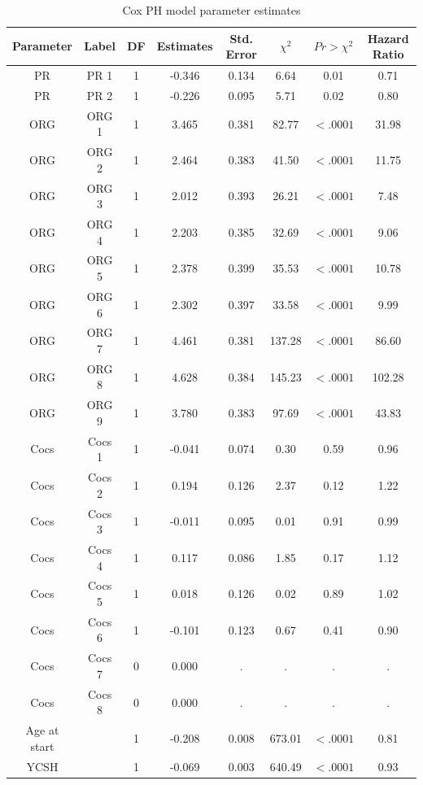 \begin{table}
	\centering
	\small
	\caption{Cox PH model parameter estimates}
	\begin{tabular}{cccccccc}
		\hline
		Parameter & Label & DF    &  Estimates & Std. Error & $\chi^2$    &  $Pr>\chi^2$ & Hazard Ratio \\
		\hline
		PR    & PR 1  & 1     & -0.346 & 0.134 & 6.64  & 0.01  & 0.71 \\
		PR    & PR 2  & 1     & -0.226 & 0.095 & 5.71  & 0.02  & 0.80 \\
		ORG   & ORG 1 & 1     & 3.465 & 0.381 & 82.77 & $<.0001$ & 31.98 \\
		ORG   & ORG 2 & 1     & 2.464 & 0.383 & 41.50 & $<.0001$ & 11.75 \\
		ORG   & ORG 3 & 1     & 2.012 & 0.393 & 26.21 & $<.0001$ & 7.48 \\
		ORG   & ORG 4 & 1     & 2.203 & 0.385 & 32.69 & $<.0001 $& 9.06 \\
		ORG   & ORG 5 & 1     & 2.378 & 0.399 & 35.53 & $<.0001$ & 10.78 \\
		ORG   & ORG 6 & 1     & 2.302 & 0.397 & 33.58 & $<.0001$ & 9.99 \\
		ORG   & ORG 7 & 1     & 4.461 & 0.381 & 137.28 & $<.0001$ & 86.60 \\
		ORG   & ORG 8 & 1     & 4.628 & 0.384 & 145.23 & $<.0001$ & 102.28 \\
		ORG   & ORG 9 & 1     & 3.780 & 0.383 & 97.69 & $<.0001$ & 43.83 \\
		Cocs  & Cocs 1 & 1     & -0.041 & 0.074 & 0.30  & 0.59  & 0.96 \\
		Cocs  & Cocs 2 & 1     & 0.194 & 0.126 & 2.37  & 0.12  & 1.22 \\
		Cocs  & Cocs 3 & 1     & -0.011 & 0.095 & 0.01  & 0.91  & 0.99 \\
		Cocs  & Cocs 4 & 1     & 0.117 & 0.086 & 1.85  & 0.17  & 1.12 \\
		Cocs  & Cocs 5 & 1     & 0.018 & 0.126 & 0.02  & 0.89  & 1.02 \\
		Cocs  & Cocs 6 & 1     & -0.101 & 0.123 & 0.67  & 0.41  & 0.90 \\
		Cocs  & Cocs 7 & 0     & 0.000 & .     & .     & .     & . \\
		Cocs  & Cocs 8 & 0     & 0.000 & .     & .     & .     & . \\
		Age at start  &       & 1     & -0.208 & 0.008 & 673.01 & $<.0001$ & 0.81 \\
		YCSH  &       & 1     & -0.069 & 0.003 & 640.49 & $<.0001$ & 0.93 \\
		\hline
	\end{tabular}%
	\label{tab:para1}
\end{table}%


